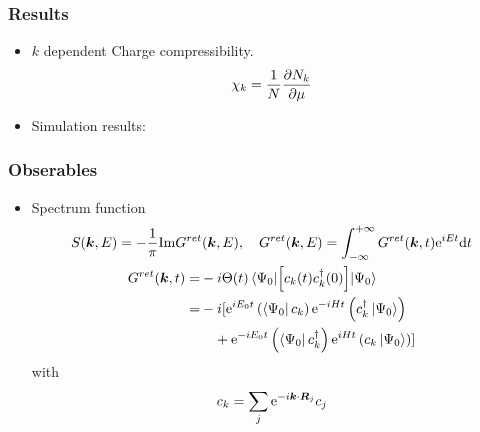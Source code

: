 \documentclass{beamer}
\begin{document}
\begin{frame}
	\frametitle{Results}
	\begin{itemize}
		\item $k$ dependent Charge compressibility.
		\begin{gather}
			\chi_k = \frac{1}{N}\pdv{N_k}{\mu}
		\end{gather}
		\item Simulation results:
		\begin{figure}[H]
			\centering
			\subfigbottomskip=2pt
			\subfigcapskip=-5pt
		\end{figure}
	\end{itemize}
\end{frame}


\begin{frame}
	\frametitle{Obserables}
	\begin{itemize}
		\item Spectrum function
		\begin{gather}
			S(\vb*{k},E) = -\frac{1}{\pi}\mathrm{Im} G^{ret}(\vb*{k},E),\quad 
			G^{ret}(\vb*{k},E) = \int_{-\infty}^{+\infty} G^{ret}(\vb*{k},t) \mathrm{e}^{iE t}\dd t\\
				\begin{aligned}
					G^{ret}(\vb*{k},t) =& -i\Theta(t)\expval{\left[c_k(t)c_k^\dagger(0)\right]}{\Psi_0}\\
					=&-i[\mathrm{e}^{iE_0t}\left(\bra{\Psi_0}c_k\right)\mathrm{e}^{-iHt}\left(c_k^\dagger\ket{\Psi_0}\right) \\
					&\quad + \mathrm{e}^{-iE_0t}\left(\bra{\Psi_0}c_k^\dagger\right)\mathrm{e}^{iHt}\left(c_k\ket{\Psi_0}\right) ]
				\end{aligned}
		\end{gather}
		with 
		\begin{equation}
			c_k = \sum_{j}\mathrm{e}^{-i\vb*{k}\cdot\vb*{R}_j}c_j
		\end{equation}
	\end{itemize}
\end{frame}
\end{document}
